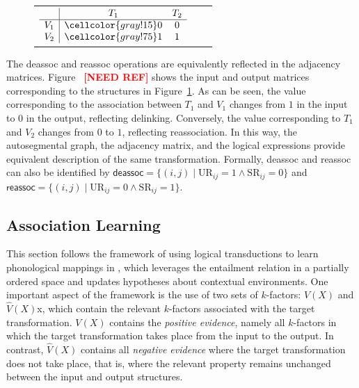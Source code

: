 \documentclass[pmlr]{jmlr}%
\newcommand{\refs}{%
    \textcolor{red}{\textbf{[NEED REF]}}%
    }
\begin{document}
\begin{figure}[ht!]
\begin{minipage}[t]{0.48\textwidth}
\begin{tabular}{c c c}
			$
			\begin{array}{c|cc}
				& T_1 & T_2\\
				\hline
				V_1 & \cellcolor{gray!15}0 & 0 \\
				V_2 & \cellcolor{gray!75}1 & 1 \\
			\end{array}
			$
			
		\end{tabular}
		
	\end{minipage}
	
	\caption{
	}
	\label{fig:hiatus}
	
\end{figure}

The \textsf{deassoc} and \textsf{reassoc} operations are
equivalently reflected in the adjacency matrices.
Figure~\refs shows the input and output
matrices corresponding to the structures in
Figure~\ref{fig:hiatus}. As can be seen, the value
corresponding to the association between $T_1$ and $V_1$
changes from $1$ in the input to $0$ in the output,
reflecting delinking. Conversely, the value corresponding
to $T_1$ and $V_2$ changes from $0$ to $1$,
reflecting reassociation. In this way, the autosegmental
graph, the adjacency matrix, and the logical expressions
provide equivalent description of the same
transformation. Formally, \textsf{deassoc} and \textsf{reassoc}
can also be identified by  $ \textsf{deassoc}
= \{(i,j) \mid \mathrm{UR}_{ij}=1 \land \mathrm{SR}_{ij}=0\}$
and $\textsf{reassoc} =
\{(i,j) \mid \mathrm{UR}_{ij}=0 \land \mathrm{SR}_{ij}=1\}$.
\subsection{Association Learning}
 This section follows the framework of using logical transductions
to learn phonological mappings in \citet{yolyan2025logical},
which leverages the entailment relation
in a partially ordered space and updates hypotheses about
contextual environments. One important aspect of the framework
is the use of two sets of $k$-factors: $V(X)$ and
$\hat{V}(X)$x, which contain the relevant $k$-factors
associated with the target transformation. 
$V(X)$ contains the \textit{positive evidence}, namely all
$k$-factors in which the target transformation takes place
from the input to the output. In contrast,
$\hat{V}(X)$ contains all \textit{negative evidence} where
the target transformation does not take place, that is,
where the relevant property remains unchanged between
the input and output structures. 
\end{document}
